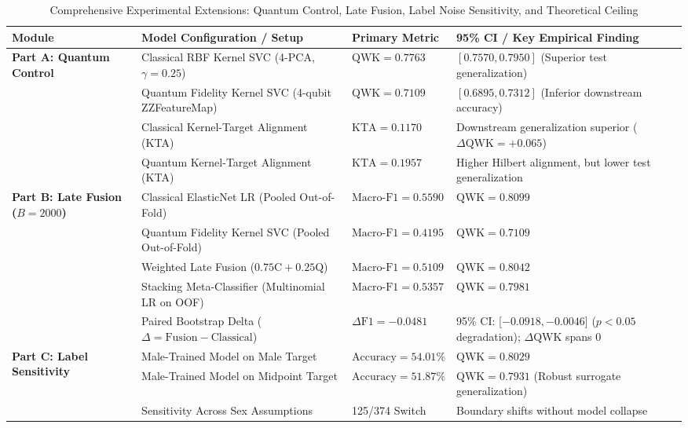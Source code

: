\documentclass{IEEEtran}
\begin{document}
\begin{table}[t]
\centering
\caption{Comprehensive Experimental Extensions: Quantum Control, Late Fusion, Label Noise Sensitivity, and Theoretical Ceiling}
\label{tab:extensions_benchmark}
\renewcommand{\arraystretch}{1.04}
\footnotesize
\begin{tabularx}{\textwidth}{p{3.2cm}p{4.5cm}p{2.2cm}X}
\toprule
\textbf{Module} & \textbf{Model Configuration / Setup} & \textbf{Primary Metric} & \textbf{95\% CI / Key Empirical Finding} \\
\midrule
\multirow{4}{*}{\textbf{Part A: Quantum Control}} 
& Classical RBF Kernel SVC (4-PCA, $\gamma = 0.25$) & $\text{QWK} = \mathbf{0.7763}$ & $[0.7570, 0.7950]$ (Superior test generalization) \\
& Quantum Fidelity Kernel SVC (4-qubit ZZFeatureMap) & $\text{QWK} = 0.7109$ & $[0.6895, 0.7312]$ (Inferior downstream accuracy) \\
& Classical Kernel-Target Alignment (KTA) & $\text{KTA} = 0.1170$ & Downstream generalization superior ($\Delta\text{QWK} = +0.065$) \\
& Quantum Kernel-Target Alignment (KTA) & $\text{KTA} = \mathbf{0.1957}$ & Higher Hilbert alignment, but lower test generalization \\
\midrule
\multirow{5}{*}{\textbf{Part B: Late Fusion ($B = 2000$)}} 
& Classical ElasticNet LR (Pooled Out-of-Fold) & $\text{Macro-F1} = \mathbf{0.5590}$ & $\text{QWK} = \mathbf{0.8099}$ \\
& Quantum Fidelity Kernel SVC (Pooled Out-of-Fold) & $\text{Macro-F1} = 0.4195$ & $\text{QWK} = 0.7109$ \\
& Weighted Late Fusion ($0.75\text{C} + 0.25\text{Q}$) & $\text{Macro-F1} = 0.5109$ & $\text{QWK} = 0.8042$ \\
& Stacking Meta-Classifier (Multinomial LR on OOF) & $\text{Macro-F1} = 0.5357$ & $\text{QWK} = 0.7981$ \\
& Paired Bootstrap Delta ($\Delta = \text{Fusion} - \text{Classical}$) & $\Delta\text{F1} = -0.0481$ & 95\% CI: [$-0.0918, -0.0046$] ($p < 0.05$ degradation); $\Delta\text{QWK}$ spans 0 \\
\midrule
\multirow{4}{*}{\textbf{Part C: Label Sensitivity}} 
& Male-Trained Model on Male Target & $\text{Accuracy} = 54.01\%$ & $\text{QWK} = 0.8029$ \\
& Male-Trained Model on Midpoint Target & $\text{Accuracy} = 51.87\%$ & $\text{QWK} = \mathbf{0.7931}$ (Robust surrogate generalization) \\
& Sensitivity Across Sex Assumptions & 125/374 Switch & Boundary shifts without model collapse \\

\end{tabularx}
\end{table}
\end{document}
